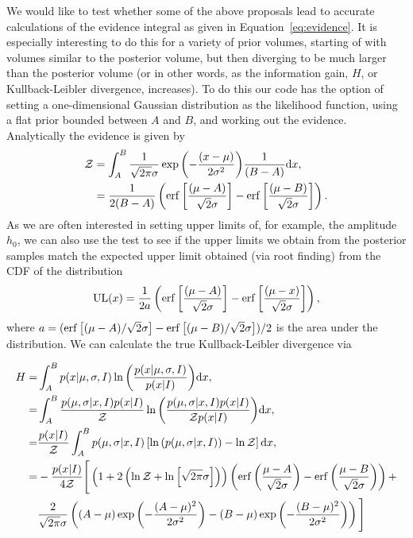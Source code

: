 We would like to test whether some of the above proposals lead to accurate calculations of the evidence integral as given in Equation~\ref{eq:evidence}.
It is especially interesting to do this for a variety of prior volumes, starting of with volumes similar to the posterior volume, but then diverging to be
much larger than the posterior volume (or in other words, as the information gain, $H$, or Kullback-Leibler divergence, increases). To do this our
code has the option of setting a one-dimensional Gaussian distribution as the likelihood function, using a flat prior bounded between $A$ and $B$,
and working out the evidence. Analytically the evidence is given by
\begin{align}\label{eq:testgaussev}
 \mathcal{Z} &= \int_A^B \frac{1}{\sqrt{2\pi}\sigma}\exp{\left(-\frac{(x-\mu)}{2\sigma^2} \right)}\frac{1}{(B-A)} \text{d}x, \nonumber \\
   &= \frac{1}{2(B-A)}\left(\operatorname{erf}{\left[\frac{(\mu-A)}{\sqrt{2}\sigma}\right]}-\operatorname{erf}{\left[\frac{(\mu-B)}{\sqrt{2}\sigma}\right]}\right).
\end{align}
As we are often interested in setting upper limits of, for example, the \gw amplitude $h_0$, we can also use the test to see if the
upper limits we obtain from the posterior samples match the expected upper limit obtained (via root finding) from the CDF of the distribution
\begin{equation}\label{eq:testcdf}
 \text{UL}(x) = \frac{1}{2a}\left(\operatorname{erf}{\left[\frac{(\mu-A)}{\sqrt{2}\sigma}\right]} - \operatorname{erf}{\left[\frac{(\mu-x)}{\sqrt{2}\sigma}\right]}\right),
\end{equation}
where $a = (\operatorname{erf}{\left[(\mu - A)/\sqrt{2}\sigma\right]} - \operatorname{erf}{\left[(\mu - B)/\sqrt{2}\sigma\right]})/2$ is the area under the distribution.
We can calculate the true Kullback-Leibler divergence via
\begin{widetext}
\begin{align}\label{eq:kldiv}
H =& \int_A^B p(x|\mu,\sigma,I) \ln{\left(\frac{p(x|\mu,\sigma,I)}{p(x|I)}\right)} \text{d}x, \nonumber \\ 
 =& \int_A^B \frac{p(\mu,\sigma|x,I)p(x|I)}{\mathcal{Z}} \ln{\left(\frac{p(\mu,\sigma|x,I)p(x|I)}{\mathcal{Z}p(x|I)}\right)} \text{d}x, \nonumber \\
 =& \frac{p(x|I)}{\mathcal{Z}} \int_A^B p(\mu,\sigma|x,I) \left[\ln{\left( p(\mu,\sigma|x,I) \right)} - \ln{\mathcal{Z}}\right] \text{d}x, \nonumber \\
 =& -\frac{p(x|I)}{4\mathcal{Z}}\Bigg[ \left(1+2\left(\ln{\mathcal{Z}} 
+\ln{\left[\sqrt{2\pi}\sigma\right]}\right)\right)\left(\operatorname{erf}{\left(\frac{\mu-A}{\sqrt{2}\sigma}\right)}-\operatorname{erf}{\left(\frac{\mu-B}{\sqrt{2}\sigma}\right)} \right) + \nonumber \\
 & \frac{2}{\sqrt{2\pi}\sigma}\left((A-\mu)\exp{\left(-\frac{(A-\mu)^2}{2\sigma^2}\right)} - (B-\mu)\exp{\left(-\frac{(B-\mu)^2}{2\sigma^2}\right)}  \right) \Bigg]
\end{align}
\end{widetext}
